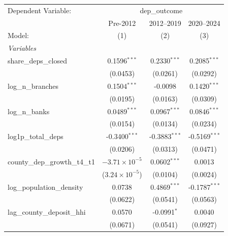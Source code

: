 \begingroup
\centering
\begin{tabular}{lccc}
   \tabularnewline \midrule \midrule
   Dependent Variable: & \multicolumn{3}{c}{dep\_outcome}\\
                                                  & Pre-2012                & 2012–2019       & 2020–2024 \\   
   Model:                                         & (1)                     & (2)             & (3)\\  
   \midrule
   \emph{Variables}\\
   share\_deps\_closed                            & 0.1596$^{***}$          & 0.2330$^{***}$  & 0.2085$^{***}$\\   
                                                  & (0.0453)                & (0.0261)        & (0.0292)\\   
   log\_n\_branches                               & 0.1504$^{***}$          & -0.0098         & 0.1420$^{***}$\\   
                                                  & (0.0195)                & (0.0163)        & (0.0309)\\   
   log\_n\_banks                                  & 0.0489$^{***}$          & 0.0967$^{***}$  & 0.0846$^{***}$\\   
                                                  & (0.0154)                & (0.0134)        & (0.0234)\\   
   log1p\_total\_deps                             & -0.3400$^{***}$         & -0.3883$^{***}$ & -0.5169$^{***}$\\   
                                                  & (0.0206)                & (0.0313)        & (0.0471)\\   
   county\_dep\_growth\_t4\_t1                    & $-3.71\times 10^{-5}$   & 0.0602$^{***}$  & 0.0013\\   
                                                  & ($3.24\times 10^{-5}$)  & (0.0104)        & (0.0024)\\   
   log\_population\_density                       & 0.0738                  & 0.4869$^{***}$  & -0.1787$^{***}$\\   
                                                  & (0.0622)                & (0.0541)        & (0.0563)\\   
   lag\_county\_deposit\_hhi                      & 0.0570                  & -0.0991$^{*}$   & 0.0040\\   
                                                  & (0.0671)                & (0.0541)        & (0.0927)\\   

\end{tabular}

